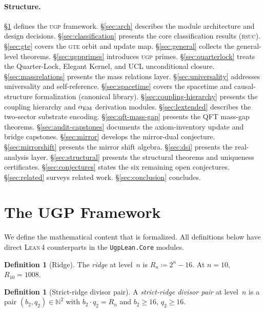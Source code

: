 \documentclass[11pt,a4paper]{article}
\theoremstyle{definition}
\newtheorem{definition}[theorem]{Definition}
\newcommand{\Rn}{R_n}
\newcommand{\ugp}{\textsc{ugp}}
\newcommand{\gte}{\textsc{gte}}
\newcommand{\rsuc}{\textsc{rsuc}}
\newcommand{\lean}{\textsc{Lean}\,4}
\newcommand{\N}{\mathbb{N}}
\begin{document}
\paragraph{Structure.}
\S\ref{sec:framework} defines the \ugp{} framework.
\S\ref{sec:arch} describes the module architecture and design decisions.
\S\ref{sec:classification} presents the core classification results
(\rsuc{}).
\S\ref{sec:gte} covers the \gte{} orbit and update map.
\S\ref{sec:general} collects the general-level theorems.
\S\ref{sec:ugpprimes} introduces \ugp{} primes.
\S\ref{sec:quarterlock} treats the Quarter-Lock, Elegant Kernel, and UCL unconditional closure.
\S\ref{sec:massrelations} presents the mass relations layer.
\S\ref{sec:universality} addresses universality and self-reference.
\S\ref{sec:spacetime} covers the spacetime and causal-structure formalization (canonical library).
\S\ref{sec:coupling-hierarchy} presents the coupling hierarchy and
$\alpha_{\rm EM}$ derivation modules.
\S\ref{sec:lextended} describes the two-sector substrate encoding.
\S\ref{sec:qft-mass-gap} presents the QFT mass-gap theorems.
\S\ref{sec:audit-capstones} documents the axiom-inventory update and bridge capstones.
\S\ref{sec:mirror} develops the mirror-dual conjecture.
\S\ref{sec:mirrorshift} presents the mirror shift algebra.
\S\ref{sec:dsi} presents the real-analysis layer.
\S\ref{sec:structural} presents the structural theorems and uniqueness certificates.
\S\ref{sec:conjectures} states the six remaining open conjectures.
\S\ref{sec:related} surveys related work.
\S\ref{sec:conclusion} concludes.

\section{The UGP Framework}\label{sec:framework}

We define the mathematical content that is formalized.  All
definitions below have direct \lean{} counterparts in the
\texttt{UgpLean.Core} modules.

\begin{definition}[Ridge]\label{def:ridge}
The \emph{ridge} at level~$n$ is $\Rn \coloneqq 2^n - 16$.
At $n = 10$, $R_{10} = 1008$.
\end{definition}

\begin{definition}[Strict-ridge divisor pair]\label{def:divisor-pair}
A \emph{strict-ridge divisor pair} at level~$n$ is a pair
$(b_2, q_2) \in \N^2$ with $b_2 \cdot q_2 = \Rn$ and
$b_2 \ge 16$, $q_2 \ge 16$.
\end{definition}
\end{document}
